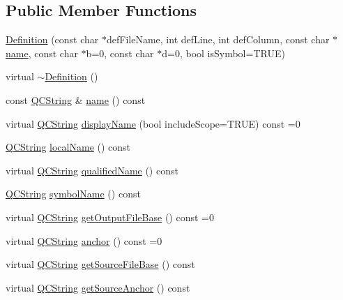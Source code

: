 \subsection*{Public Member Functions}
\begin{DoxyCompactItemize}
\item 
\mbox{\hyperlink{class_definition_afdf318b0b806e2b5b1fcdcf682bc338b}{Definition}} (const char $\ast$def\+File\+Name, int def\+Line, int def\+Column, const char $\ast$\mbox{\hyperlink{class_definition_a9324000f785d7b6b098878a3bca4df5b}{name}}, const char $\ast$b=0, const char $\ast$d=0, bool is\+Symbol=T\+R\+UE)
\item 
virtual \mbox{\hyperlink{class_definition_a37def2c2ca8cdc02e9f614657169e654}{$\sim$\+Definition}} ()
\item 
const \mbox{\hyperlink{class_q_c_string}{Q\+C\+String}} \& \mbox{\hyperlink{class_definition_a9324000f785d7b6b098878a3bca4df5b}{name}} () const
\item 
virtual \mbox{\hyperlink{class_q_c_string}{Q\+C\+String}} \mbox{\hyperlink{class_definition_ac4741f70f06baac174cf71b3e11d06ac}{display\+Name}} (bool include\+Scope=T\+R\+UE) const =0
\item 
\mbox{\hyperlink{class_q_c_string}{Q\+C\+String}} \mbox{\hyperlink{class_definition_a5cff26b8db9bc19c6f61445ed8d88a46}{local\+Name}} () const
\item 
virtual \mbox{\hyperlink{class_q_c_string}{Q\+C\+String}} \mbox{\hyperlink{class_definition_a60354ebca3cb065a4a6aa1944a9309d5}{qualified\+Name}} () const
\item 
\mbox{\hyperlink{class_q_c_string}{Q\+C\+String}} \mbox{\hyperlink{class_definition_aeb2dfc3db363a10f4d4cd1150a0ea43e}{symbol\+Name}} () const
\item 
virtual \mbox{\hyperlink{class_q_c_string}{Q\+C\+String}} \mbox{\hyperlink{class_definition_acabecdc6bfda2015811eed5f3436322d}{get\+Output\+File\+Base}} () const =0
\item 
virtual \mbox{\hyperlink{class_q_c_string}{Q\+C\+String}} \mbox{\hyperlink{class_definition_a56e91f9b76f41208a22cfb2336871604}{anchor}} () const =0
\item 
virtual \mbox{\hyperlink{class_q_c_string}{Q\+C\+String}} \mbox{\hyperlink{class_definition_abdb114d4da6048e834ccae02393790df}{get\+Source\+File\+Base}} () const
\item 
virtual \mbox{\hyperlink{class_q_c_string}{Q\+C\+String}} \mbox{\hyperlink{class_definition_a7199d0a6628c0883e5797f6b2f9f634c}{get\+Source\+Anchor}} () const
\item 

\end{DoxyCompactItemize}
